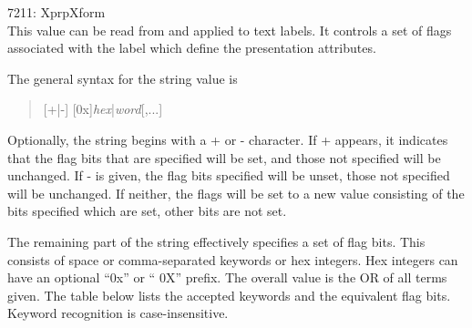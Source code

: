 \begin{description}
\item{7211: {\et XprpXform}}\\
This value can be read from and applied to text labels.  It controls a
set of flags associated with the label which define the presentation
attributes.

The general syntax for the string value is
\begin{quote}
[{\vt +|-}] [{\vt 0x}]{\it hex\/}{\vt |}{\it word\/}[,...]
\end{quote}

Optionally, the string begins with a {\vt +} or {\vt -} character. 
If {\vt +} appears, it indicates that the flag bits that are specified
will be set, and those not specified will be unchanged.  If {\vt -}
is given, the flag bits specified will be unset, those not specified
will be unchanged.  If neither, the flags will be set to a new value
consisting of the bits specified which are set, other bits are not
set.

The remaining part of the string effectively specifies a set of flag
bits.  This consists of space or comma-separated keywords or hex
integers.  Hex integers can have an optional ``{\vt 0x}'' or ``{\vt
0X}'' prefix.  The overall value is the OR of all terms given.  The
table below lists the accepted keywords and the equivalent flag bits. 
Keyword recognition is case-insensitive.


\end{description}
